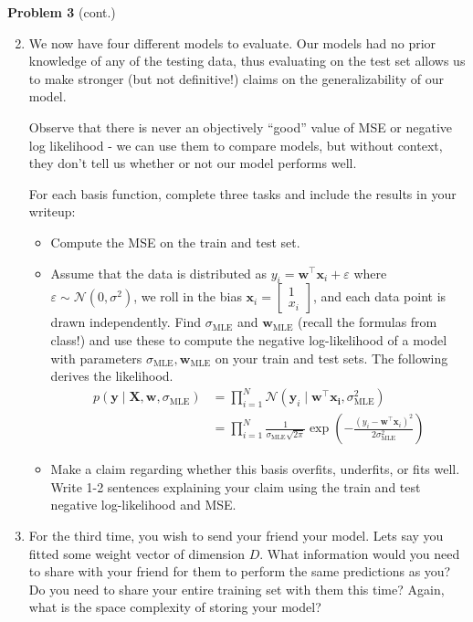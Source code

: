\documentclass[submit]{harvardml}
\begin{document}
\newpage
\begin{framed}
\noindent\textbf{Problem 3} (cont.)\\
\begin{enumerate}
\setcounter{enumi}{1}
\item 

We now have four different models to evaluate. Our models had no
prior knowledge of any of the testing data, thus evaluating on
the test set allows us to make stronger (but not definitive!) 
claims on the generalizability of our model.

Observe that there is never an objectively ``good'' value of MSE or negative log likelihood - we can use them to compare models, but without context, they don't tell us whether or not our model performs well.

For each basis function, complete three tasks and include the
results in your writeup: 
\begin{itemize}
\item Compute the MSE on the train and test set. 

\item Assume that the data is distributed as 
$y_i = \mathbf{w}^\top \mathbf{x}_i + \varepsilon$ where 
$\varepsilon \sim \mathcal{N}(0, \sigma^2)$, we roll in the bias 
$\mathbf{x}_i = \begin{bmatrix} 1 \\ x_i \end{bmatrix}$, and each data point
is drawn independently. Find $\sigma_{\text{MLE}}$ and $\mathbf{w}_{\text{MLE}}$ (recall the formulas from class!) and use these to 
compute the negative log-likelihood of a model with parameters $\sigma_{\text{MLE}}, \mathbf{w}_{\text{MLE}}$ on your train and test sets. 
The following derives the likelihood.
\begin{align*} p(\mathbf{y}\mid \mathbf{X},\mathbf{w},\sigma_{\text{MLE}}) 
&= \prod_{i=1}^N \mathcal{N}(\mathbf{y}_i \mid \mathbf{w}^\top\mathbf{x_i}, \sigma_{\text{MLE}}^2) \\
&= \prod_{i=1}^N \frac{1}{\sigma_{\text{MLE}}\sqrt{2\pi}}\exp\left(-\frac{(y_i - \mathbf{w}^\top \mathbf{x}_i)^2}{2\sigma_{\text{MLE}}^2}\right)
\end{align*}

\item Make a claim regarding whether this basis overfits, 
underfits, or fits well. Write 1-2 sentences explaining your 
claim using the train and test negative log-likelihood and MSE.

\end{itemize}
\item For the third time, you wish to send your friend your model. Lets say you fitted some weight vector of dimension $D$. What information would you need to share with your friend for them to perform the same predictions as you? Do you need to share your entire training set with them this time? Again, what is the space complexity of storing your model?


\end{enumerate}
\end{framed}
\end{document}
